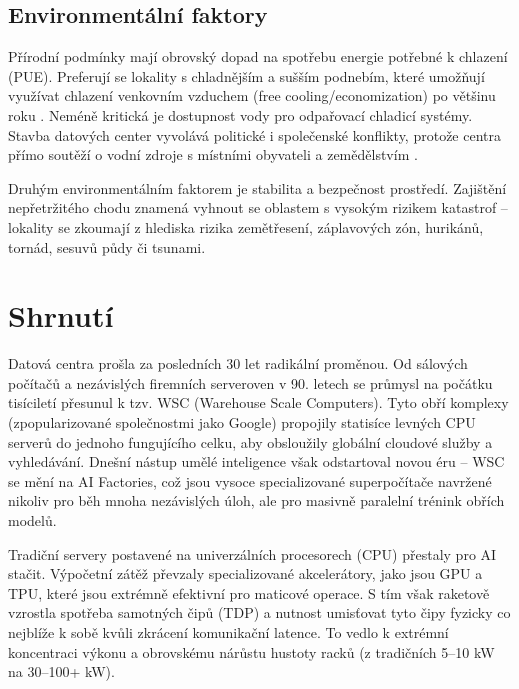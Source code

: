 \subsection{Environmentální faktory}
\label{subsec:pestle_en}

Přírodní podmínky mají obrovský dopad na spotřebu energie potřebné k chlazení (PUE). Preferují se lokality s chladnějším a sušším podnebím, které umožňují využívat chlazení venkovním vzduchem (free cooling/economization) po většinu roku \cite{barroso_data_2026, geng_data_2014}. Neméně kritická je dostupnost vody pro odpařovací chladicí systémy. Stavba datových center vyvolává politické i společenské konflikty, protože centra přímo soutěží o vodní zdroje s místními obyvateli a zemědělstvím \cite[s. 4]{shah_four_2026}.

Druhým environmentálním faktorem je stabilita a bezpečnost prostředí. Zajištění nepřetržitého chodu znamená vyhnout se oblastem s vysokým rizikem katastrof – lokality se zkoumají z hlediska rizika zemětřesení, záplavových zón, hurikánů, tornád, sesuvů půdy či tsunami. \cite{tatnall_reflections_2012,geng_data_2014}


\section{Shrnutí}
\label{sec:shrnuti}

Datová centra prošla za posledních 30 let radikální proměnou. Od sálových počítačů a nezávislých firemních serveroven v 90. letech se průmysl na počátku tisíciletí přesunul k tzv. WSC (Warehouse Scale Computers). Tyto obří komplexy (zpopularizované společnostmi jako Google) propojily statisíce levných CPU serverů do jednoho fungujícího celku, aby obsloužily globální cloudové služby a vyhledávání. Dnešní nástup umělé inteligence však odstartoval novou éru – WSC se mění na AI Factories, což jsou vysoce specializované superpočítače navržené nikoliv pro běh mnoha nezávislých úloh, ale pro masivně paralelní trénink obřích modelů. \cite{barroso_data_2026,geng_data_2014,barroso_brief_2021}

Tradiční servery postavené na univerzálních procesorech (CPU) přestaly pro AI stačit. Výpočetní zátěž převzaly specializované akcelerátory, jako jsou GPU a TPU, které jsou extrémně efektivní pro maticové operace. S tím však raketově vzrostla spotřeba samotných čipů (TDP) a nutnost umisťovat tyto čipy fyzicky co nejblíže k sobě kvůli zkrácení komunikační latence. To vedlo k extrémní koncentraci výkonu a obrovskému nárůstu hustoty racků (z tradičních 5–10 kW na 30–100+ kW). \cite{chen_electricity_2025, barroso_data_2026, sheng_power_2026}

